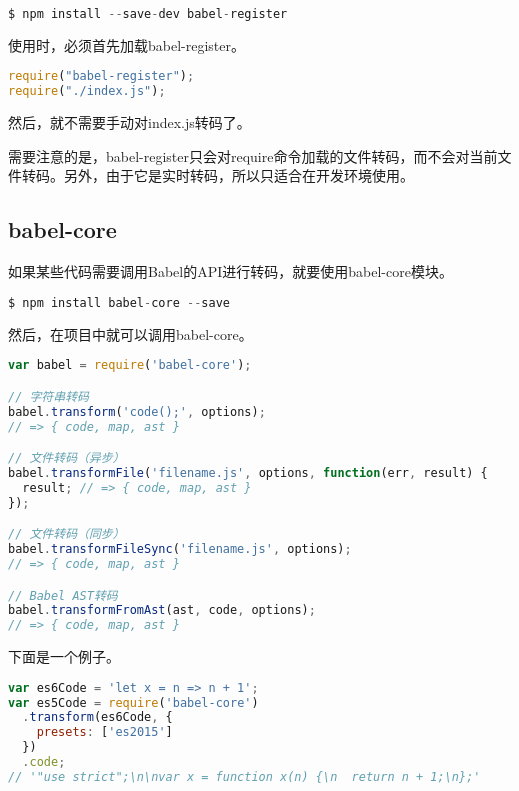 \begin{lstlisting}[language=JavaScript]
$ npm install --save-dev babel-register
\end{lstlisting}



使用时，必须首先加载babel-register。

\begin{lstlisting}[language=JavaScript]
require("babel-register");
require("./index.js");
\end{lstlisting}


然后，就不需要手动对index.js转码了。

需要注意的是，babel-register只会对require命令加载的文件转码，而不会对当前文件转码。另外，由于它是实时转码，所以只适合在开发环境使用。



\subsection{babel-core}


如果某些代码需要调用Babel的API进行转码，就要使用babel-core模块。


\begin{lstlisting}[language=JavaScript]
$ npm install babel-core --save
\end{lstlisting}


然后，在项目中就可以调用babel-core。


\begin{lstlisting}[language=JavaScript]
var babel = require('babel-core');

// 字符串转码
babel.transform('code();', options);
// => { code, map, ast }

// 文件转码（异步）
babel.transformFile('filename.js', options, function(err, result) {
  result; // => { code, map, ast }
});

// 文件转码（同步）
babel.transformFileSync('filename.js', options);
// => { code, map, ast }

// Babel AST转码
babel.transformFromAst(ast, code, options);
// => { code, map, ast }
\end{lstlisting}


下面是一个例子。

\begin{lstlisting}[language=JavaScript]
var es6Code = 'let x = n => n + 1';
var es5Code = require('babel-core')
  .transform(es6Code, {
    presets: ['es2015']
  })
  .code;
// '"use strict";\n\nvar x = function x(n) {\n  return n + 1;\n};'
\end{lstlisting}


